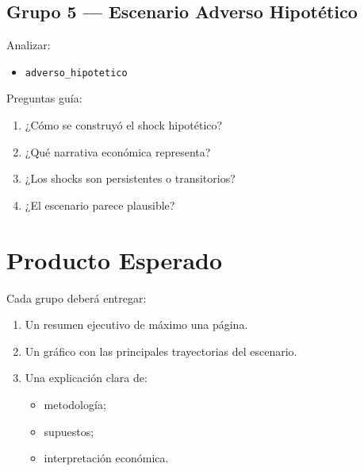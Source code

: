 \documentclass[12pt]{article}
\begin{document}

\subsection*{Grupo 5 — Escenario Adverso Hipotético}

Analizar:

\begin{itemize}
    \item \texttt{adverso\_hipotetico}
\end{itemize}

Preguntas guía:

\begin{enumerate}
    \item ¿Cómo se construyó el shock hipotético?
    \item ¿Qué narrativa económica representa?
    \item ¿Los shocks son persistentes o transitorios?
    \item ¿El escenario parece plausible?
\end{enumerate}

\vspace{0.5cm}


\section*{Producto Esperado}

Cada grupo deberá entregar:

\begin{enumerate}
    \item Un resumen ejecutivo de máximo una página.
    
    \item Un gráfico con las principales trayectorias del escenario.
    
    \item Una explicación clara de:
    
    \begin{itemize}
        \item metodología;
        \item supuestos;
        \item interpretación económica.
    \end{itemize}
\end{enumerate}
\end{document}
